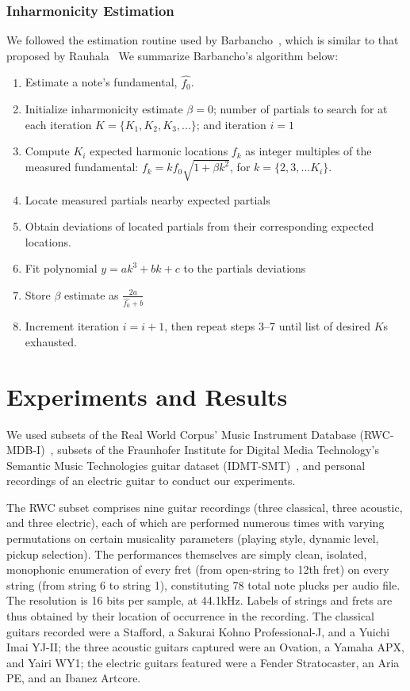 \documentclass[12pt]{cmuthesis}
\begin{document}
\subsection{Inharmonicity Estimation}
We followed the estimation routine used by Barbancho~\cite{barbanchoi2012}, which is similar to that proposed by Rauhala~\cite{rauhala} We summarize Barbancho's algorithm below: 
\begin{enumerate}
\item Estimate a note's fundamental, $\hat{f_0}$.
\item Initialize inharmonicity estimate $\beta = 0$; number of partials to search for at each iteration $K = \{K_1,K_2,K_3,...\}$; and iteration $i=1$
\item Compute $K_i$ expected harmonic locations $f_k$ as integer multiples of the measured fundamental: $f_k = kf_0\sqrt{1+\beta k^2}$, for $k = \{2,3,...K_i\}$.
\item Locate measured partials nearby expected partials
\item Obtain deviations of located partials from their corresponding expected locations. 
\item Fit polynomial $y = ak^3 + bk + c$ to the partials deviations
\item Store $\beta$ estimate as $\frac{2a}{\hat{f_0}+b}$
\item Increment iteration $i = i+1$, then repeat steps 3--7 until list of desired $K$s exhausted.
\end{enumerate}

\noindent
\chapter{Experiments and Results}
We used subsets of the Real World Corpus' Music Instrument Database (RWC-MDB-I)~\cite{goto2003}, subsets of the Fraunhofer Institute for Digital Media Technology's Semantic Music Technologies guitar dataset (IDMT-SMT)~\cite{asdf}, and personal recordings of an electric guitar to conduct our experiments. 

The RWC subset comprises nine guitar recordings (three classical, three acoustic, and three electric), each of which are performed numerous times with varying permutations on certain musicality parameters (playing style, dynamic level, pickup selection). The performances themselves are simply clean, isolated, monophonic enumeration of every fret (from open-string to 12th fret) on every string (from string 6 to string 1), constituting 78 total note plucks per audio file. The resolution is 16 bits per sample, at 44.1kHz. Labels of strings and frets are thus obtained by their location of occurrence in the recording. The classical guitars recorded were a Stafford, a Sakurai Kohno Professional-J, and a Yuichi Imai YJ-II; the three acoustic guitars captured were an Ovation, a Yamaha APX, and Yairi WY1; the electric guitars featured were a Fender Stratocaster, an Aria PE, and an Ibanez Artcore.
\end{document}
